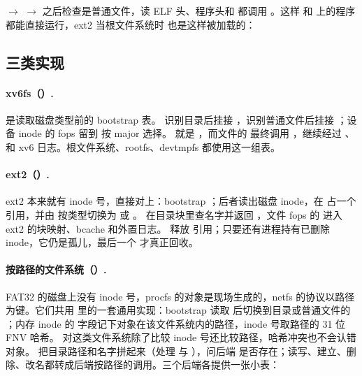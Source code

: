  $\to$  $\to$  之后检查是普通文件，读 ELF 头、程序头和  都调用 。这样  和  上的程序都能直接运行，ext2 当根文件系统时  也是这样被加载的：


\subsection{三类实现}

\paragraph{xv6fs（）.}  是读取磁盘类型前的 bootstrap 表。 识别目录后挂接 ，识别普通文件后挂接 ；设备 inode 的 fops 留到  按 major 选择。 就是 ，而文件的  最终调用 ，继续经过 、 和 xv6 日志。根文件系统、rootfs、devtmpfs 都使用这一组表。

\paragraph{ext2（）.} ext2 本来就有 inode 号，直接对上：bootstrap ；后者读出磁盘 inode，在  占一个引用，并由  按类型切换为  或 。 在目录块里查名字并返回 ，文件 fops 的  进入 ext2 的块映射、bcache 和外置日志。 释放  引用；只要还有进程持有已删除 inode，它仍是孤儿，最后一个  才真正回收。

\paragraph{按路径的文件系统（）.} FAT32 的磁盘上没有 inode 号，procfs 的对象是现场生成的，netfs 的协议以路径为键。它们共用  里的一套通用实现：bootstrap  读取  后切换到目录或普通文件的 ；内存 inode 的  字段记下对象在该文件系统内的路径，inode 号取路径的 31 位 FNV 哈希。 对这类文件系统除了比较 inode 号还比较路径，哈希冲突也不会认错对象。 把目录路径和名字拼起来（处理  与 ），问后端  是否存在；读写、建立、删除、改名都转成后端按路径的调用。三个后端各提供一张小表：

